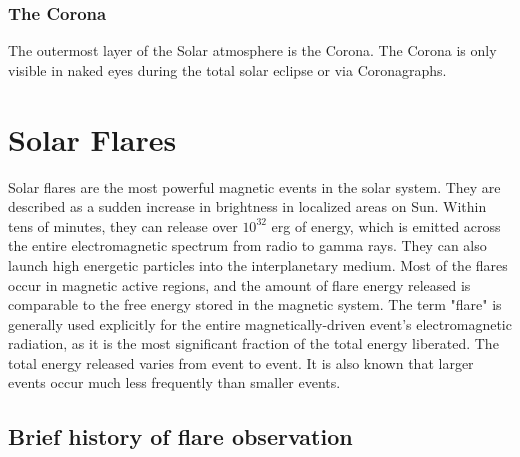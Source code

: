 \subsubsection{The Corona}\label{corona}

The outermost layer of the Solar atmosphere is the Corona. The Corona is only visible in naked eyes during the total solar eclipse or via Coronagraphs.






\section{Solar Flares}\label{sol_flr}

Solar flares are the most powerful magnetic events in the solar system. They are described as a sudden increase in brightness in localized areas on Sun. Within tens of minutes, they can release over $10^{32}$ erg of energy, which is emitted across the entire electromagnetic spectrum from radio to gamma rays. They can also launch high energetic particles into the interplanetary medium. Most of the flares occur in magnetic active regions, and the amount of flare energy released is comparable to the free energy stored in the magnetic system. The term "flare" is generally used explicitly for the entire magnetically-driven event's electromagnetic radiation, as it is the most significant fraction of the total energy liberated. The total energy released varies from event to event. It is also known that larger events occur much less frequently than smaller events.

\subsection{Brief history of flare observation}\label{sol_flr_1}

